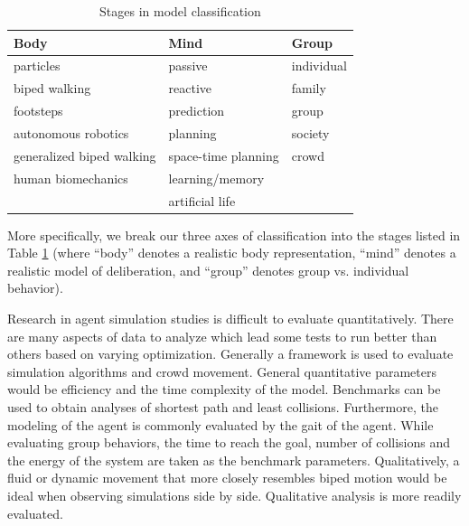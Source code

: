 \documentclass[tog]{acmsiggraph}
\begin{document}
\begin{table}
\centering
\begin{tabular}{|l|l|l|} \hline
Body                      & Mind                & Group      \\ \hline
particles                 & passive             & individual \\
biped walking             & reactive            & family     \\
footsteps                 & prediction          & group      \\
autonomous robotics       & planning            & society    \\
generalized biped walking & space-time planning & crowd      \\
human biomechanics        & learning/memory     &            \\
                          & artificial life     &            \\ \hline
\end{tabular}
\caption{Stages in model classification}
\label{table:axes}
\end{table}

More specifically, we break our three axes of classification into the stages listed in Table \ref{table:axes} (where ``body'' denotes a realistic body representation, ``mind'' denotes a realistic model of deliberation, and ``group'' denotes group vs. individual behavior).



Research in agent simulation studies is difficult to evaluate quantitatively. There are many aspects of data to analyze which lead some tests to run better than others based on varying optimization. Generally a framework is used to evaluate simulation algorithms and crowd movement. General quantitative parameters would be efficiency and the time complexity of the model. Benchmarks can be used to obtain analyses of shortest path and least collisions. Furthermore, the modeling of the agent is commonly evaluated by the gait of the agent. While evaluating group behaviors, the time to reach the goal, number of collisions and the energy of the system are taken as the benchmark parameters. Qualitatively, a fluid or dynamic movement that more closely resembles biped motion would be ideal when observing simulations side by side. Qualitative analysis is more readily evaluated.
\end{document}
